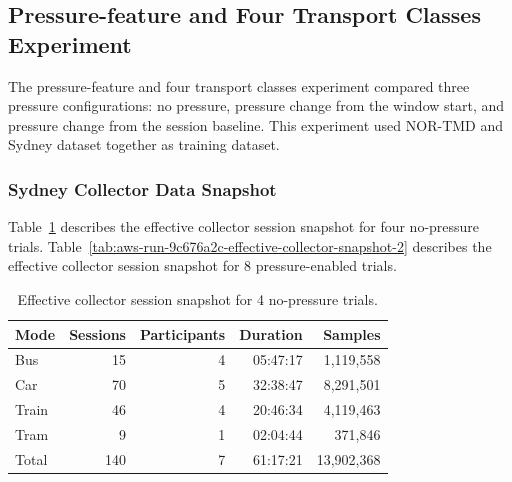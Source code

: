 \subsection{Pressure-feature and Four Transport Classes Experiment}

The pressure-feature and four transport classes experiment compared three pressure configurations: no pressure, pressure change from the window start, and pressure change from the session baseline. This experiment used NOR-TMD and Sydney dataset together as training dataset.

\subsubsection{Sydney Collector Data Snapshot}

Table~\ref{tab:aws-run-9c676a2c-effective-collector-snapshot-1} describes the effective collector session snapshot for four no-pressure trials. Table~\ref{tab:aws-run-9c676a2c-effective-collector-snapshot-2} describes the effective collector session snapshot for 8 pressure-enabled trials.

\begin{table}[htbp]
\centering
\caption{Effective collector session snapshot for 4 no-pressure trials.}
\label{tab:aws-run-9c676a2c-effective-collector-snapshot-1}
\begin{tabular}{lrrrr}
\hline
\textbf{Mode} & \textbf{Sessions} & \textbf{Participants} & \textbf{Duration} & \textbf{Samples} \\
\hline
Bus & 15 & 4 & 05:47:17 & 1,119,558 \\
Car & 70 & 5 & 32:38:47 & 8,291,501 \\
Train & 46 & 4 & 20:46:34 & 4,119,463 \\
Tram & 9 & 1 & 02:04:44 & 371,846 \\
Total & 140 & 7 & 61:17:21 & 13,902,368 \\
\hline
\end{tabular}
\end{table}

